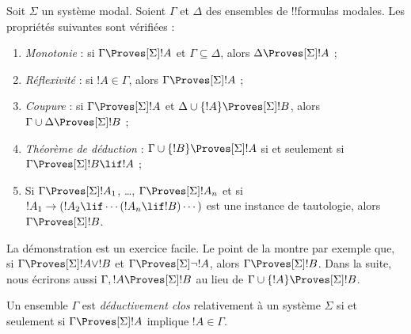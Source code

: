 \documentclass[../../../include/open-logic-section]{subfiles}
\begin{document}


\begin{prop}
  Soit $\Sigma$ un système modal. Soient $\Gamma$ et $\Delta$ des
  ensembles de !!{formula}s modales. Les propriétés suivantes sont vérifiées :
  \begin{enumerate}
  \item{} \emph{Monotonie} : si
    $\Gamma \Proves[\Sigma] !A$ et $\Gamma \subseteq \Delta$, alors
    $\Delta \Proves[\Sigma] !A$ ;
  \item{}
    \emph{Réflexivité} : si $!A \in \Gamma$, alors $\Gamma
    \Proves[\Sigma] !A$ ;
  \item{} \emph{Coupure} : si $\Gamma
    \Proves[\Sigma] !A$ et $\Delta \cup \{!A\} \Proves[\Sigma] !B$,
    alors $\Gamma \cup \Delta \Proves[\Sigma] !B$ ;
  \item{} \emph{Théorème de déduction} :
    $\Gamma \cup \{!B\} \Proves[\Sigma] !A$ si et seulement si
    $\Gamma \Proves[\Sigma] !B \lif !A$ ;
  \item{} Si
    $\Gamma \Proves[\Sigma] !A_1$, \dots, $\Gamma
    \Proves[\Sigma] !A_n$ et si $!A_1 \to (!A_2 \lif \cdots (!A_n \lif
    !B)\cdots)$ est une instance de tautologie, alors $\Gamma
    \Proves[\Sigma] !B$.
  \end{enumerate}
\end{prop}

La démonstration est un exercice facile. Le point
 de la
 montre par exemple que, si
$\Gamma \Proves[\Sigma] !A \lor !B$ et
$\Gamma \Proves[\Sigma] \lnot !A$, alors
$\Gamma \Proves[\Sigma] !B$. Dans la suite, nous écrirons aussi
$\Gamma, !A \Proves[\Sigma] !B$ au lieu de
$\Gamma \cup \{ !A\} \Proves[\Sigma] !B$.

\begin{defn}
  Un ensemble $\Gamma$ est \emph{déductivement clos} relativement à
  un système $\Sigma$ si et seulement si
  $\Gamma \Proves[\Sigma] !A$ implique $!A \in \Gamma$.
\end{defn}
\end{document}

